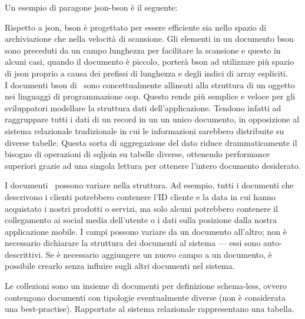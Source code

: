 \noindent
Un esempio di paragone \acrshort{json}-\acrshort{bson} è il seguente:

Rispetto a \acrshort{json}, \acrshort{bson} è progettato per essere efficiente sia nello spazio di archiviazione che nella velocità di scansione. Gli elementi in un documento \acrshort{bson} sono preceduti da un campo lunghezza per facilitare la scansione e questo in alcuni casi, quando il documento è piccolo,  porterà \acrshort{bson} ad utilizzare più spazio di \acrshort{json} proprio a causa dei prefissi di lunghezza e degli indici di array espliciti. \\

\noindent
I documenti \acrshort{bson} di \mongodb~sono concettualmente allineati alla struttura di un oggetto nei linguaggi di programmazione \acrshort{oop}. Questo rende più semplice e veloce per gli sviluppatori modellare la struttura dati dell'applicazione. Tendono infatti ad raggruppare tutti i dati di un record in un un unico documento, in opposizione al sistema relazionale tradizionale in cui le informazioni sarebbero distribuite su diverse tabelle. Questa sorta di aggregazione del dato riduce drammaticamente il bisogno di operazioni di \gls{sqljoin} su tabelle diverse, ottenendo performance superiori grazie ad una singola lettura per ottenere l'intero documento desiderato.

I documenti \mongodb~possono variare nella struttura. Ad esempio, tutti i documenti che descrivono i clienti potrebbero contenere l'ID cliente e la data in cui hanno acquistato i nostri prodotti o servizi, ma solo alcuni potrebbero contenere il collegamento ai social media dell'utente o i dati sulla posizione dalla nostra applicazione mobile. I campi possono variare da un documento all'altro; non è necessario dichiarare la struttura dei documenti al sistema --- essi sono auto-descrittivi. Se è necessario aggiungere un nuovo campo a un documento, è possibile crearlo senza influire sugli altri documenti nel sistema.

Le collezioni sono un insieme di documenti per  definizione schema-less, ovvero contengono documenti con tipologie eventualmente diverse (non è considerata una best-practise). Rapportate al sistema relazionale rappresentano una tabella.

